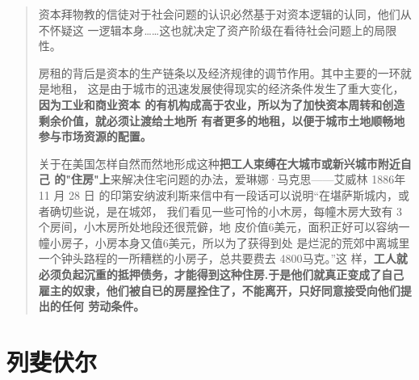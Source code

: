 \begin{quotation}
  资本拜物教的信徒对于社会问题的认识必然基于对资本逻辑的认同，他们从不怀疑这
  一逻辑本身……这也就决定了资产阶级在看待社会问题上的局限
  性。\cite[100]{zhuzhaiwenti}

  房租的背后是资本的生产链条以及经济规律的调节作用。其中主要的一环就是地租，
  这是由于城市的迅速发展使得现实的经济条件发生了重大变化，\textbf{因为工业和商业资本
  的有机构成高于农业，所以为了加快资本周转和创造剩余价值，就必须让渡给土地所
  有者更多的地租，以便于城市土地顺畅地参与市场资源的配置。}


关于在美国怎样自然而然地形成这种\textbf{把工人束缚在大城市或新兴城市附近自己
  的"住房"上}来解决住宅问题的办法，爱琳娜·马克思——艾威林 1886年11 月 28 日
的印第安纳波利斯来信中有一段话可以说明“在堪萨斯城内，或者确切些说，是在城郊，
我们看见一些可怜的小木房，每幢木房大致有 3 个房间，小木房所处地段还很荒僻，地
皮价值6美元，面积正好可以容纳一幢小房子，小房本身又值6美元，所以为了获得到处
是烂泥的荒郊中离城里一个钟头路程的一所糟糕的小房子，总共要费去 4800马克。”这
样，\textbf{工人就必须负起沉重的抵押债务，才能得到这种住房.于是他们就真正变成了自己
  雇主的奴隶，他们被自已的房屋拴住了，不能离开，只好同意接受向他们提出的任何
  劳动条件。}
\end{quotation}



\section{列斐伏尔}

